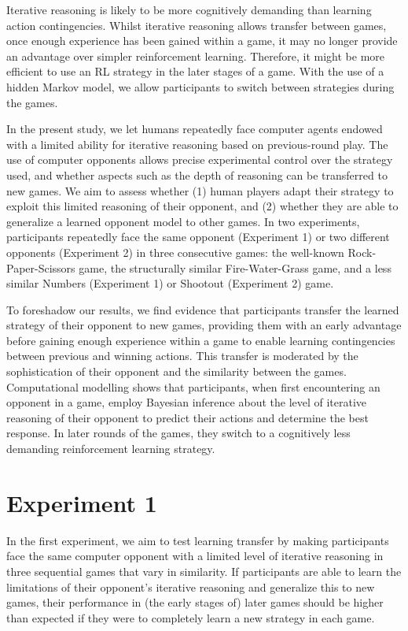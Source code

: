 \documentclass[smallextended]{svjour3}       %
\begin{document}
Iterative reasoning is likely to be more cognitively demanding than
learning action contingencies. Whilst iterative reasoning allows
transfer between games, once enough experience has been gained within a
game, it may no longer provide an advantage over simpler reinforcement
learning. Therefore, it might be more efficient to use an RL strategy in
the later stages of a game. With the use of a hidden Markov model, we
allow participants to switch between strategies during the games.

In the present study, we let humans repeatedly face computer agents
endowed with a limited ability for iterative reasoning based on
previous-round play. The use of computer opponents allows precise
experimental control over the strategy used, and whether aspects such as
the depth of reasoning can be transferred to new games. We aim to assess
whether (1) human players adapt their strategy to exploit this limited
reasoning of their opponent, and (2) whether they are able to generalize
a learned opponent model to other games. In two experiments,
participants repeatedly face the same opponent (Experiment 1) or two
different opponents (Experiment 2) in three consecutive games: the
well-known Rock-Paper-Scissors game, the structurally similar
Fire-Water-Grass game, and a less similar Numbers (Experiment 1) or
Shootout (Experiment 2) game.

To foreshadow our results, we find evidence that participants transfer
the learned strategy of their opponent to new games, providing them with
an early advantage before gaining enough experience within a game to
enable learning contingencies between previous and winning actions. This
transfer is moderated by the sophistication of their opponent and the
similarity between the games. Computational modelling shows that
participants, when first encountering an opponent in a game, employ
Bayesian inference about the level of iterative reasoning of their
opponent to predict their actions and determine the best response. In
later rounds of the games, they switch to a cognitively less demanding
reinforcement learning strategy.

\hypertarget{experiment-1}{%
\section{Experiment 1}\label{experiment-1}}

In the first experiment, we aim to test learning transfer by making
participants face the same computer opponent with a limited level of
iterative reasoning in three sequential games that vary in similarity.
If participants are able to learn the limitations of their opponent's
iterative reasoning and generalize this to new games, their performance
in (the early stages of) later games should be higher than expected if
they were to completely learn a new strategy in each game.
\end{document}
